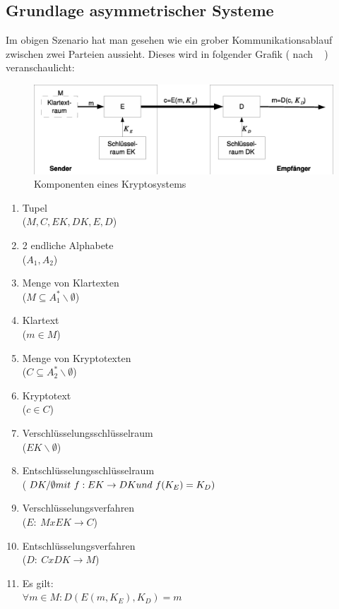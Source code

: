 \documentclass[paper=a4,11pt,german]{scrartcl} %
\begin{document}
\subsection{Grundlage asymmetrischer Systeme}
Im obigen Szenario hat man gesehen wie ein grober Kommunikationsablauf zwischen zwei Parteien aussieht. Dieses wird in folgender Grafik ( nach ~\cite{Eckert13} ) veranschaulicht:
\begin{figure}[htb]
	\centering
	\includegraphics[width=\textwidth]{async.eps}
	\caption{Komponenten eines Kryptosystems}
	\label{fig:sim}
\end{figure}
\begin{multicols}{2}
\begin{enumerate}
\item Tupel \\($M,C,EK,DK,E,D$)
\item 2 endliche Alphabete \\($A_1,A_2$)
\item Menge von Klartexten \\($M \subseteq A^*_1\backslash\emptyset$)
\item Klartext \\($m \in M$)
\item Menge von Kryptotexten \\($C \subseteq A^*_2\backslash\emptyset$)
\item Kryptotext \\($c \in C$)
\item Verschlüsselungsschlüsselraum \\($EK\backslash\emptyset$)
\item Entschlüsselungsschlüsselraum\\($DK/\emptyset \\mit~ f:EK \rightarrow DK \\und~ f(K_E)=K_D)$
\item Verschlüsselungsverfahren \\($E :~ M x EK \rightarrow C$)
\item Entschlüsselungsverfahren \\($D :~ C x DK \rightarrow M$)
\item Es gilt: \\ $\forall m \in M : D(E(m,K_E),K_D) = m$
\end{enumerate}
\end{multicols}
\end{document}
